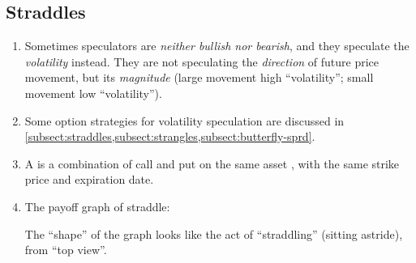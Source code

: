\subsection{Straddles}
\label{subsect:straddles}
\begin{enumerate}
\item Sometimes speculators are \emph{neither bullish nor bearish}, and
they speculate the \emph{volatility} instead. They are not speculating the
\emph{direction} of future price movement, but its \emph{magnitude} (large
movement  high ``volatility''; small movement
 low ``volatility'').
\item Some option strategies for volatility speculation are discussed in
\cref{subsect:straddles,subsect:strangles,subsect:butterfly-sprd}.
\item A  is a combination of call and put on the same asset
, with the same strike price and expiration date.

\item The payoff graph of straddle:
\begin{center}
\end{center}
\begin{note}
The ``shape'' of the graph looks like the act of ``straddling'' (sitting
astride), from ``top view''.
\end{note}



\end{enumerate}
